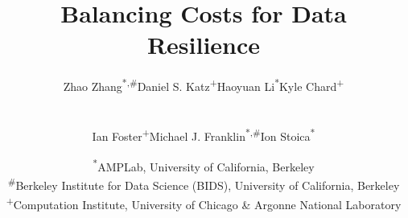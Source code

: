 \documentclass{sig-alternate}
\begin{document}

\title{Balancing Costs for Data Resilience}

\author{
\begin{tabular}{cccc}
{Zhao Zhang\textsuperscript{*,\#}} & {Daniel S. Katz\textsuperscript{+}} & {Haoyuan Li\textsuperscript{*}} & {Kyle Chard\textsuperscript{+}} 
\end{tabular}
\\
\begin{tabular}{ccc}
{Ian Foster\textsuperscript{+}} & {Michael J. Franklin\textsuperscript{*,\#}} & {Ion Stoica\textsuperscript{*}}
\end{tabular}
\and %
\begin{tabular}{c}
\textsuperscript{*}AMPLab, University of California, Berkeley \\
\textsuperscript{\#}Berkeley Institute for Data Science (BIDS), University of California, Berkeley \\
\textsuperscript{+}Computation Institute, University of Chicago \& Argonne National Laboratory
\end{tabular}
} 

\maketitle

\end{document}
